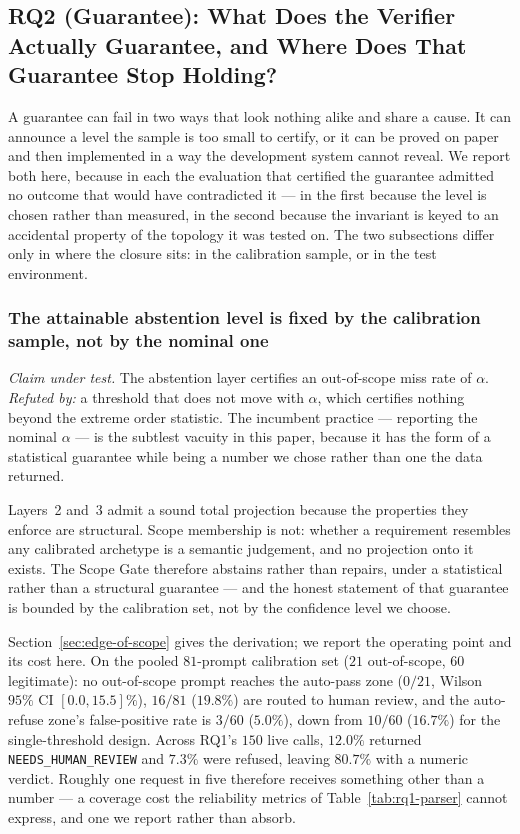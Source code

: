\documentclass[journal, 10pt]{IEEEtran}
\begin{document}
\subsection{RQ2 (Guarantee): What Does the Verifier Actually Guarantee, and Where Does That Guarantee Stop Holding?}
\label{sec:rq2}

A guarantee can fail in two ways that look nothing alike and share a cause. It
can announce a level the sample is too small to certify, or it can be proved on
paper and then implemented in a way the development system cannot reveal. We
report both here, because in each the evaluation that certified the guarantee
admitted no outcome that would have contradicted it --- in the first because the
level is chosen rather than measured, in the second because the invariant is
keyed to an accidental property of the topology it was tested on. The two
subsections differ only in where the closure sits: in the calibration sample, or
in the test environment.

\subsubsection{The attainable abstention level is fixed by the calibration sample, not by the nominal one}
\label{sec:rq2-alpha}

\emph{Claim under test.} The abstention layer certifies an out-of-scope miss rate
of $\alpha$. \emph{Refuted by:} a threshold that does not move with $\alpha$,
which certifies nothing beyond the extreme order statistic. The incumbent
practice --- reporting the nominal $\alpha$ --- is the subtlest vacuity in this
paper, because it has the form of a statistical guarantee while being a number we
chose rather than one the data returned.

Layers~2 and~3 admit a sound total projection because the properties they enforce
are structural. Scope membership is not: whether a requirement resembles any
calibrated archetype is a semantic judgement, and no projection onto it exists.
The Scope Gate therefore abstains rather than repairs, under a statistical rather
than a structural guarantee --- and the honest statement of that guarantee is
bounded by the calibration set, not by the confidence level we choose.

Section~\ref{sec:edge-of-scope} gives the derivation; we report the operating
point and its cost here. On the pooled $81$-prompt calibration set
($21$ out-of-scope, $60$ legitimate): no out-of-scope prompt reaches the
auto-pass zone ($0/21$, Wilson $95\%$ CI $[0.0,15.5]\%$), $16/81$ ($19.8\%$) are
routed to human review, and the auto-refuse zone's false-positive rate is
$3/60$ ($5.0\%$), down from $10/60$ ($16.7\%$) for the single-threshold design.
Across RQ1's $150$ live calls, $12.0\%$ returned \texttt{NEEDS\_HUMAN\_REVIEW}
and $7.3\%$ were refused, leaving $80.7\%$ with a numeric verdict. Roughly one
request in five therefore receives something other than a number --- a coverage
cost the reliability metrics of Table~\ref{tab:rq1-parser} cannot express, and one we
report rather than absorb.
\end{document}
